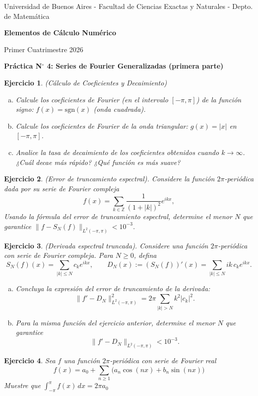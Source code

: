 \documentclass[12pt]{article}
\newtheorem{exercise}{Ejercicio}
\newcommand{\bej}{\begin{exercise}\rm}
\newcommand{\fej}{\end{exercise}}
\begin{document}
\centerline{{\small Universidad de Buenos Aires - Facultad de Ciencias Exactas y Naturales - Depto. de Matemática}}
 
 \vskip 0.2cm
 \hrulefill
 \vskip 0.2cm

 \centerline{{\bf\Huge {\sc Elementos de Cálculo Numérico}}}
 \vskip 0.2cm
 \centerline{\ttfamily Primer Cuatrimestre 2026}
 \hrulefill

 \bigskip
 \centerline{\bf Práctica N$^\circ$ 4: Series de Fourier Generalizadas (primera parte)}
 \bigskip

\bej (Cálculo de Coeficientes y Decaimiento)
\begin{enumerate}[(a)]
    \item Calcule los coeficientes de Fourier (en el intervalo $[-\pi, \pi]$) de la función signo: $f(x) = \text{sgn}(x)$ (onda cuadrada).
    \item Calcule los coeficientes de Fourier de la onda triangular: $g(x) = |x|$ en $[-\pi, \pi]$.
    \item Analice la tasa de decaimiento de los coeficientes obtenidos cuando $k \to \infty$. ¿Cuál decae más rápido? ¿Qué función es más suave?
\end{enumerate}
\fej

\bej (Error de truncamiento espectral). Considere la función $2\pi$-periódica dada por su serie de Fourier compleja
\[
f(x)=\sum_{k\in\mathbb Z} \frac{1}{(1+|k|)^2} e^{ikx},
\]
Usando la fórmula del error de truncamiento espectral, determine el menor $N$ que garantice $\|f-S_N(f)\|_{L^2(-\pi,\pi)}<10^{-3}$.

\fej

\bej (Derivada espectral truncada). Considere una función $2\pi$-periódica con serie de Fourier compleja. Para $N\ge 0$, defina
\[
S_N(f)(x)=\sum_{|k|\le N} c_k e^{ikx},
\qquad
D_N(x):=(S_N(f))'(x)=\sum_{|k|\le N} ik\,c_k e^{ikx}.
\]
\begin{enumerate}[(a)]
    \item Concluya la expresión del error de truncamiento de la derivada:
    \[
    \|f'-D_N\|_{L^2(-\pi,\pi)}^2=2\pi\sum_{|k|>N}k^2|c_k|^2.
    \]
    \item Para la misma función del ejercicio anterior, determine el menor $N$ que garantice
    \[
    \|f'-D_N\|_{L^2(-\pi,\pi)}<10^{-3}.
    \]
\end{enumerate}
\fej

\bej 
Sea $f$ una función $2\pi$-periódica con serie de Fourier real 
$$f(x)=a_0+\sum_{n\ge 1}\big(a_n\cos(nx)+b_n\sin(nx)\big)$$ 
Muestre que $\int_{-\pi}^{\pi} f(x)\,dx=2\pi a_0$
\fej
\end{document}
